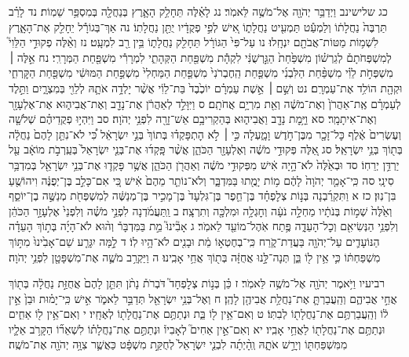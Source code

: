 \documentclass[twoside, openany, parskip=half, 11pt]{book}
\begin{document}
כג שלישינב וַיְדַבֵּ֥ר יְהֹוָ֖ה אֶל־מֹשֶׁ֥ה לֵּאמֹֽר׃ נג לָאֵ֗לֶּה תֵּחָלֵ֥ק הָאָ֛רֶץ בְּנַחֲלָ֖ה בְּמִסְפַּ֥ר שֵׁמֽוֹת׃ נד לָרַ֗ב תַּרְבֶּה֙ נַחֲלָת֔וֹ וְלַמְעַ֕ט תַּמְעִ֖יט נַחֲלָת֑וֹ אִ֚ישׁ לְפִ֣י פְקֻדָ֔יו יֻתַּ֖ן נַחֲלָתֽוֹ׃ נה אַךְ־בְּגוֹרָ֕ל יֵחָלֵ֖ק אֶת־הָאָ֑רֶץ לִשְׁמ֥וֹת מַטּוֹת־אֲבֹתָ֖ם יִנְחָֽלוּ׃ נו עַל־פִּי֙ הַגּוֹרָ֔ל תֵּחָלֵ֖ק נַחֲלָת֑וֹ בֵּ֥ין רַ֖ב לִמְעָֽט׃
נז וְאֵ֨לֶּה פְקוּדֵ֣י הַלֵּוִי֮ לְמִשְׁפְּחֹתָם֒ לְגֵרְשׁ֗וֹן מִשְׁפַּ֙חַת֙ הַגֵּ֣רְשֻׁנִּ֔י לִקְהָ֕ת מִשְׁפַּ֖חַת הַקְּהָתִ֑י לִמְרָרִ֕י מִשְׁפַּ֖חַת הַמְּרָרִֽי׃ נח אֵ֣לֶּה ׀ מִשְׁפְּחֹ֣ת לֵוִ֗י מִשְׁפַּ֨חַת הַלִּבְנִ֜י מִשְׁפַּ֤חַת הַֽחֶבְרֹנִי֙ מִשְׁפַּ֤חַת הַמַּחְלִי֙ מִשְׁפַּ֣חַת הַמּוּשִׁ֔י מִשְׁפַּ֖חַת הַקׇּרְחִ֑י וּקְהָ֖ת הוֹלִ֥ד אֶת־עַמְרָֽם׃ נט וְשֵׁ֣ם ׀ אֵ֣שֶׁת עַמְרָ֗ם יוֹכֶ֙בֶד֙ בַּת־לֵוִ֔י אֲשֶׁ֨ר יָלְדָ֥ה אֹתָ֛הּ לְלֵוִ֖י בְּמִצְרָ֑יִם וַתֵּ֣לֶד לְעַמְרָ֗ם אֶֽת־אַהֲרֹן֙ וְאֶת־מֹשֶׁ֔ה וְאֵ֖ת מִרְיָ֥ם אֲחֹתָֽם׃ ס וַיִּוָּלֵ֣ד לְאַהֲרֹ֔ן אֶת־נָדָ֖ב וְאֶת־אֲבִיה֑וּא אֶת־אֶלְעָזָ֖ר וְאֶת־אִיתָמָֽר׃ סא וַיָּ֥מׇת נָדָ֖ב וַאֲבִיה֑וּא בְּהַקְרִיבָ֥ם אֵשׁ־זָרָ֖ה לִפְנֵ֥י יְהֹוָה׃ סב וַיִּהְי֣וּ פְקֻדֵיהֶ֗ם שְׁלֹשָׁ֤ה וְעֶשְׂרִים֙ אֶ֔לֶף כׇּל־זָכָ֖ר מִבֶּן־חֹ֣דֶשׁ וָמָ֑עְלָה כִּ֣י ׀ לֹ֣א הׇתְפָּקְד֗וּ בְּתוֹךְ֙ בְּנֵ֣י יִשְׂרָאֵ֔ל כִּ֠י לֹא־נִתַּ֤ן לָהֶם֙ נַחֲלָ֔ה בְּת֖וֹךְ בְּנֵ֥י יִשְׂרָאֵֽל׃ סג אֵ֚לֶּה פְּקוּדֵ֣י מֹשֶׁ֔ה וְאֶלְעָזָ֖ר הַכֹּהֵ֑ן אֲשֶׁ֨ר פָּֽקְד֜וּ אֶת־בְּנֵ֤י יִשְׂרָאֵל֙ בְּעַֽרְבֹ֣ת מוֹאָ֔ב עַ֖ל יַרְדֵּ֥ן יְרֵחֽוֹ׃ סד וּבְאֵ֙לֶּה֙ לֹא־הָ֣יָה אִ֔ישׁ מִפְּקוּדֵ֣י מֹשֶׁ֔ה וְאַהֲרֹ֖ן הַכֹּהֵ֑ן אֲשֶׁ֥ר פָּקְד֛וּ אֶת־בְּנֵ֥י יִשְׂרָאֵ֖ל בְּמִדְבַּ֥ר סִינָֽי׃ סה כִּֽי־אָמַ֤ר יְהֹוָה֙ לָהֶ֔ם מ֥וֹת יָמֻ֖תוּ בַּמִּדְבָּ֑ר וְלֹא־נוֹתַ֤ר מֵהֶם֙ אִ֔ישׁ כִּ֚י אִם־כָּלֵ֣ב בֶּן־יְפֻנֶּ֔ה וִיהוֹשֻׁ֖עַ בִּן־נֽוּן׃
כז א וַתִּקְרַ֜בְנָה בְּנ֣וֹת צְלׇפְחָ֗ד בֶּן־חֵ֤פֶר בֶּן־גִּלְעָד֙ בֶּן־מָכִ֣יר בֶּן־מְנַשֶּׁ֔ה לְמִשְׁפְּחֹ֖ת מְנַשֶּׁ֣ה בֶן־יוֹסֵ֑ף וְאֵ֙לֶּה֙ שְׁמ֣וֹת בְּנֹתָ֔יו מַחְלָ֣ה נֹעָ֔ה וְחׇגְלָ֥ה וּמִלְכָּ֖ה וְתִרְצָֽה׃ ב וַֽתַּעֲמֹ֜דְנָה לִפְנֵ֣י מֹשֶׁ֗ה וְלִפְנֵי֙ אֶלְעָזָ֣ר הַכֹּהֵ֔ן וְלִפְנֵ֥י הַנְּשִׂיאִ֖ם וְכׇל־הָעֵדָ֑ה פֶּ֥תַח אֹֽהֶל־מוֹעֵ֖ד לֵאמֹֽר׃ ג אָבִ֘ינוּ֮ מֵ֣ת בַּמִּדְבָּר֒ וְה֨וּא לֹא־הָיָ֜ה בְּת֣וֹךְ הָעֵדָ֗ה הַנּוֹעָדִ֛ים עַל־יְהֹוָ֖ה בַּעֲדַת־קֹ֑רַח כִּֽי־בְחֶטְא֣וֹ מֵ֔ת וּבָנִ֖ים לֹא־הָ֥יוּ לֽוֹ׃ ד לָ֣מָּה יִגָּרַ֤ע שֵׁם־אָבִ֙ינוּ֙ מִתּ֣וֹךְ מִשְׁפַּחְתּ֔וֹ כִּ֛י אֵ֥ין ל֖וֹ בֵּ֑ן תְּנָה־לָּ֣נוּ אֲחֻזָּ֔ה בְּת֖וֹךְ אֲחֵ֥י אָבִֽינוּ׃ ה וַיַּקְרֵ֥ב מֹשֶׁ֛ה אֶת־מִשְׁפָּטָ֖ן לִפְנֵ֥י יְהֹוָה׃

רביעיו וַיֹּ֥אמֶר יְהֹוָ֖ה אֶל־מֹשֶׁ֥ה לֵּאמֹֽר׃ ז כֵּ֗ן בְּנ֣וֹת צְלׇפְחָד֮ דֹּבְרֹת֒ נָתֹ֨ן תִּתֵּ֤ן לָהֶם֙ אֲחֻזַּ֣ת נַחֲלָ֔ה בְּת֖וֹךְ אֲחֵ֣י אֲבִיהֶ֑ם וְהַֽעֲבַרְתָּ֛ אֶת־נַחֲלַ֥ת אֲבִיהֶ֖ן לָהֶֽן׃ ח וְאֶל־בְּנֵ֥י יִשְׂרָאֵ֖ל תְּדַבֵּ֣ר לֵאמֹ֑ר אִ֣ישׁ כִּֽי־יָמ֗וּת וּבֵן֙ אֵ֣ין ל֔וֹ וְהַֽעֲבַרְתֶּ֥ם אֶת־נַחֲלָת֖וֹ לְבִתּֽוֹ׃ ט וְאִם־אֵ֥ין ל֖וֹ בַּ֑ת וּנְתַתֶּ֥ם אֶת־נַחֲלָת֖וֹ לְאֶחָֽיו׃ י וְאִם־אֵ֥ין ל֖וֹ אַחִ֑ים וּנְתַתֶּ֥ם אֶת־נַחֲלָת֖וֹ לַאֲחֵ֥י אָבִֽיו׃ יא וְאִם־אֵ֣ין אַחִים֮ לְאָבִיו֒ וּנְתַתֶּ֣ם אֶת־נַחֲלָת֗וֹ לִשְׁאֵר֞וֹ הַקָּרֹ֥ב אֵלָ֛יו מִמִּשְׁפַּחְתּ֖וֹ וְיָרַ֣שׁ אֹתָ֑הּ וְֽהָ֨יְתָ֜ה לִבְנֵ֤י יִשְׂרָאֵל֙ לְחֻקַּ֣ת מִשְׁפָּ֔ט כַּאֲשֶׁ֛ר צִוָּ֥ה יְהֹוָ֖ה אֶת־מֹשֶֽׁה׃
\end{document}
